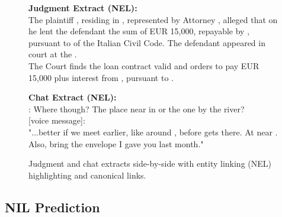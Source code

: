 \begin{figure}[htbp]
\centering
\begin{minipage}[t]{0.48\linewidth}
\ttfamily
\small
\textbf{Judgment Extract (NEL):}\\[0.5em]
The plaintiff , residing in , represented by Attorney , alleged that on  he lent the defendant  the sum of EUR 15,000, repayable by , pursuant to  of the Italian Civil Code. The defendant appeared in court at the .\\[0.5em]
The Court finds the loan contract valid and orders  to pay  EUR 15,000 plus interest from , pursuant to .\\
\end{minipage}
\hfill
\begin{minipage}[t]{0.48\linewidth}
\ttfamily
\small
\textbf{Chat Extract (NEL):}\\[0.5em]
 : Where though? The place near  in  or the one by the river?\\[0.3em]
  [voice message]: \\
"...better if we meet earlier, like around , before  gets there. At  near . Also, bring the envelope I gave you last month."\\
\end{minipage}
\caption{Judgment and chat extracts side-by-side with entity linking (NEL) highlighting and canonical links.}
\label{fig:extracts-nel-new}
\end{figure}


\subsection{NIL Prediction}

